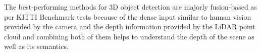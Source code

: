 \documentclass[10pt,twocolumn,letterpaper]{article}
\begin{document}

The best-performing methods for 3D object detection are majorly fusion-based as per KITTI Benchmark tests \cite{KITTI2012} because of the dense input similar to human vision provided by the camera and the depth information provided by the LiDAR point cloud and combining both of them helps to understand the depth of the scene as well as its semantics.
\end{document}
